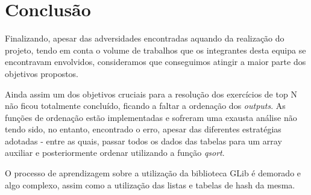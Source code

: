 \documentclass[12pt,a4paper]{article}
\begin{document}
\clearpage

\section{Conclusão}
    \par Finalizando, apesar das adversidades encontradas aquando da realização do projeto, tendo em conta o volume de trabalhos que os integrantes desta equipa se encontravam envolvidos, consideramos que conseguimos atingir a maior parte dos objetivos propostos.

    \par  Ainda assim um dos objetivos cruciais para a resolução dos exercícios de top N não ficou totalmente concluído, ficando a faltar a ordenação dos \textit{outputs}. As funções de ordenação estão implementadas e sofreram uma exausta análise não tendo sido, no entanto, encontrado o erro, apesar das diferentes estratégias adotadas - entre as quais, passar todos os dados das tabelas para um array auxiliar e posteriormente ordenar utilizando a função \textit{qsort}.
    
    \par O processo de aprendizagem sobre a utilização da biblioteca GLib  é demorado e algo complexo, assim como a utilização das listas e tabelas de hash da mesma.

    
\clearpage


\clearpage
\end{document}
